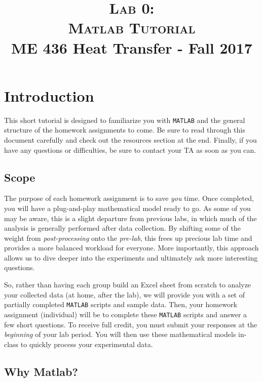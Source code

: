 \documentclass[11pt, letterpaper]{article}
\title{ \textsc{Lab 0: \\ Matlab Tutorial} \\ {\large  \color{darkgray} ME 436 Heat Transfer - Fall 2017}}
\begin{document}
\date{}
\maketitle
\thispagestyle{firstpage} 


\section*{Introduction}

This short tutorial is designed to familiarize you with \texttt{MATLAB} and the general structure of the homework assignments to come. Be sure to read through this document carefully and check out the resources section at the end. Finally, if you have any questions or difficulties, be sure to contact your TA as soon as you can.

\subsection*{Scope}

The purpose of each homework assignment is to save \textit{you} time. Once completed, you will have a plug-and-play mathematical model ready to go. 
As some of you may be aware, this is a slight departure from previous labs, in which much of the analysis is generally performed after data collection. 
By shifting some of the weight from \textit{post-processing} onto the \textit{pre-lab}, this frees up precious lab time and provides a more balanced workload for everyone. 
More importantly, this approach allows us to dive deeper into the experiments and ultimately ask more interesting questions.

\n
So, rather than having each group build an Excel sheet from scratch to analyze your collected data (at home, after the lab), we will provide you with a set of partially completed \texttt{MATLAB} scripts and sample data.
Then, your homework assignment (individual) will be to complete these \texttt{MATLAB} scripts and answer a few short questions. To receive full credit, you must submit your responses at the \textit{beginning} of your lab period. 
You will then use these mathematical models in-class to quickly process your experimental data.
 
\subsection*{Why Matlab?}
\end{document}
